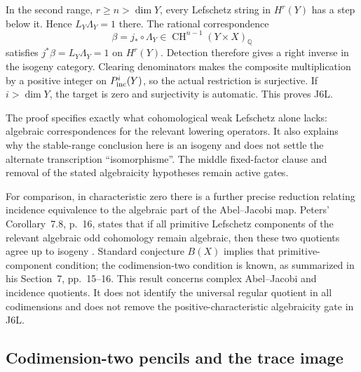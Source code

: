 In the second range, $r\geq n>\dim Y$, every Lefschetz string in
$H^r(Y)$ has a step below it. Hence $L_Y\Lambda_Y=1$ there.
The rational correspondence
\[
 \beta=j_*\circ\Lambda_Y\in
           \operatorname{CH}^{n-1}(Y\times X)_{\mathbb Q}
\]
satisfies $j^*\beta=L_Y\Lambda_Y=1$ on $H^r(Y)$. Detection
therefore gives a right inverse in the isogeny category.
Clearing denominators makes the composite multiplication by a
positive integer on $P^i_{\rm inc}(Y)$, so the actual
restriction is surjective. If $i>\dim Y$, the target is zero
and surjectivity is automatic. This proves J6L.

The proof specifies exactly what cohomological weak Lefschetz
alone lacks: algebraic correspondences for the relevant lowering
operators. It also explains why the stable-range conclusion here
is an isogeny and does not settle the alternate transcription
``isomorphisme''. The middle fixed-factor clause and removal of
the stated algebraicity hypotheses remain active gates.

For comparison, in characteristic zero there is a further precise
reduction relating incidence equivalence to the algebraic part of
the Abel--Jacobi map. Peters' Corollary~7.8, p.~16, states that
if all primitive Lefschetz components of the relevant algebraic
odd cohomology remain algebraic, then these two quotients agree
up to isogeny \cite{DGJ_Peters2026}. Standard conjecture $B(X)$
implies that primitive-component condition; the codimension-two
condition is known, as summarized in his Section~7, pp.~15--16.
This result concerns complex Abel--Jacobi and incidence quotients.
It does not identify the universal regular quotient in all
codimensions and does not remove the positive-characteristic
algebraicity gate in J6L.


\subsection{Codimension-two pencils and the trace image}
